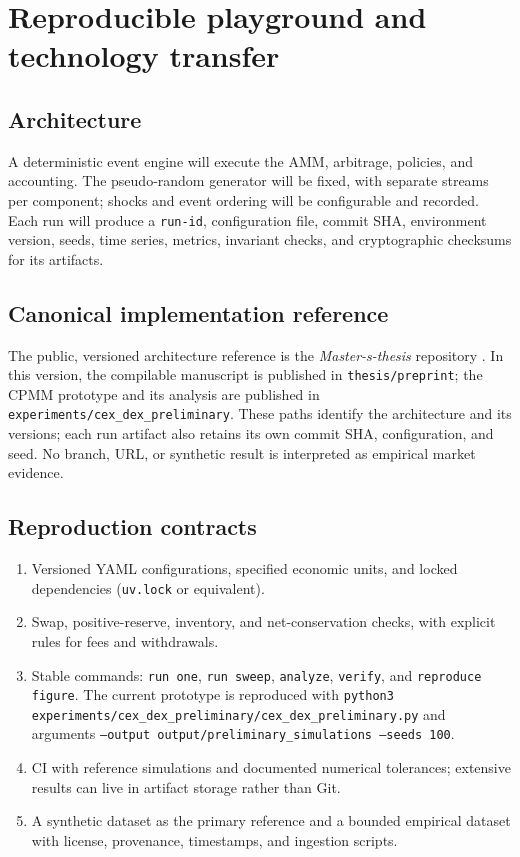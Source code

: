\section{Reproducible playground and technology transfer}

\subsection{Architecture}

A deterministic event engine will execute the AMM, arbitrage, policies, and
accounting. The pseudo-random generator will be fixed, with separate streams per
component; shocks and event ordering will be configurable and recorded. Each run
will produce a \texttt{run-id}, configuration file, commit SHA, environment version,
seeds, time series, metrics, invariant checks, and cryptographic checksums for its
artifacts.

\subsection{Canonical implementation reference}

The public, versioned architecture reference is the \textit{Master-s-thesis}
repository \cite{calderon2026repository}. In this version, the compilable manuscript
is published in \texttt{thesis/preprint}; the CPMM prototype and its analysis are
published in \texttt{experiments/cex\_dex\_preliminary}. These paths identify the
architecture and its versions; each run artifact also retains its own commit SHA,
configuration, and seed. No branch, URL, or synthetic result is interpreted as
empirical market evidence.

\subsection{Reproduction contracts}

\begin{enumerate}
  \item Versioned YAML configurations, specified economic units, and locked
    dependencies (\texttt{uv.lock} or equivalent).
  \item Swap, positive-reserve, inventory, and net-conservation checks, with explicit
    rules for fees and withdrawals.
  \item Stable commands: \texttt{run one}, \texttt{run sweep}, \texttt{analyze},
    \texttt{verify}, and \texttt{reproduce figure}. The current prototype is reproduced
    with \texttt{python3 experiments/cex\_dex\_preliminary/cex\_dex\_preliminary.py}
    and arguments \texttt{--output output/preliminary\_simulations --seeds 100}.
  \item CI with reference simulations and documented numerical tolerances; extensive
    results can live in artifact storage rather than Git.
  \item A synthetic dataset as the primary reference and a bounded empirical dataset
    with license, provenance, timestamps, and ingestion scripts.
\end{enumerate}

